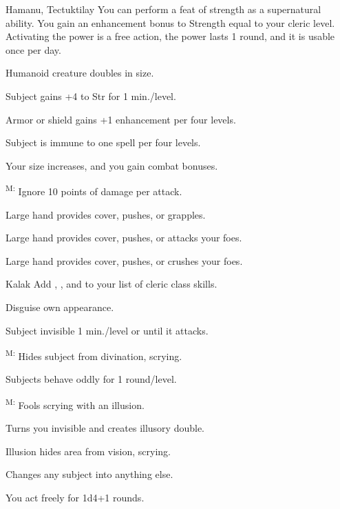 {Hamanu, Tectuktilay}
{You can perform a feat of strength as a supernatural ability. You gain an enhancement bonus to Strength equal to your cleric level. Activating the power is a free action, the power lasts 1 round, and it is usable once per day.}
{
	\item {} Humanoid creature doubles in size.
	\item {} Subject gains +4 to Str for 1 min./level.
	\item {} Armor or shield gains +1 enhancement per four levels.
	\item {} Subject is immune to one spell per four levels.
	\item {} Your size increases, and you gain combat bonuses.
	\item {}\textsuperscript{M:} Ignore 10 points of damage per attack.
	\item {} Large hand provides cover, pushes, or grapples.
	\item {} Large hand provides cover, pushes, or attacks your foes.
	\item {} Large hand provides cover, pushes, or crushes your foes.
}


{Kalak}
{Add , , and  to your list of cleric class skills.}
{
	\item {} Disguise own appearance.
	\item {} Subject invisible 1 min./level or until it attacks.
	\item {}\textsuperscript{M:} Hides subject from divination, scrying.
	\item {} Subjects behave oddly for 1 round/level.
	\item {}\textsuperscript{M:} Fools scrying with an illusion.
	\item {} Turns you invisible and creates illusory double.
	\item {} Illusion hides area from vision, scrying.
	\item {} Changes any subject into anything else.
	\item {} You act freely for 1d4+1 rounds.
}


